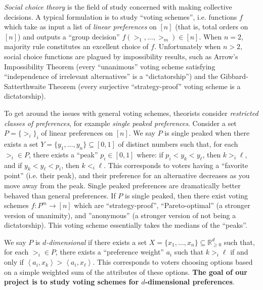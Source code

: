 \documentclass[12pt]{article}
\newcommand{\R}{\mathbb{R}}
\newcommand{\ip}[2]{\left\langle{#1},{#2}\right\rangle}
\newcommand{\1}[1]{\mathds{1}[{#1}]}
\begin{document}
  \emph{Social choice theory} is the field of study
  concerned with making collective decisions. A typical formulation
  is to study ``voting schemes'', i.e.
  functions $f$ which take as input a list of \emph{linear
  preferences} on $[n]$ (that is, total orders on $[n]$) and outputs a
  ``group decision'' $f(>_1,\ldots,>_m) \in [n]$.
  When $n = 2$, majority rule constitutes an excellent choice of $f$.
  Unfortunately when $n>2$, social choice functions are
  plagued by impossibility results,
  such as Arrow's Impossibility Theorem (every ``unanimous'' voting scheme
  satisfying ``independence of irrelevant alternatives'' is a ``dictatorship'')
  and the Gibbard-Satterthwaite Theorem (every surjective 
  ``strategy-proof'' voting scheme is a dictatorship).

  To get around the issues with general voting schemes, theorists
  consider \emph{restricted classes of preferences},
  for example \emph{single peaked preferences}.
  Consider a set $P = \{>_i\}_{i}$ of linear preferences on $[n]$.
  We say $P$ is single peaked when there exists a set
  $Y = \{y_1,\ldots,y_n\} \subseteq [0,1]$ of distinct numbers such that,
  for each $>_i \in P$, there exists a ``peak'' $p_i \in [0,1]$
  where: if $p_i < y_k < y_\ell$, then $k >_i \ell$,
  and if $y_k < y_\ell < p_i$, then $k <_i \ell$.
  This corresponds to voters having a ``favorite point'' (i.e.
  their peak), and their preference for an alternative decreases
  as you move away from the peak.
  Single peaked preferences are dramatically better behaved
  than general preferences.
  If $P$ is single peaked, then there exist voting schemes
  $f : P^m \to [n]$ which are ``strategy-proof'',
  ``Pareto-optimal'' (a stronger
  version of unanimity), and ''anonymous'' (a stronger version
  of not being a dictatorship).
  This voting scheme essentially takes the medians of the ``peaks''.

  We say $P$ is \emph{$d$-dimensional} if there exists a set
  $X = \{x_1,\ldots,x_n\} \subseteq \R_{\ge 0}^d$ such that, for each $>_i \in P$,
  there exists a ``preference weight'' $a_i$ such that
  $k >_i \ell$ if and only if $\ip{a_i}{x_k} > \ip{a_i}{x_\ell}$.
  This corresponds to voters choosing options based on a simple weighted
  sum of the attributes of these options.
  \textbf{The goal of our project is to study voting schemes
  for $d$-dimensional preferences}.
\end{document}
